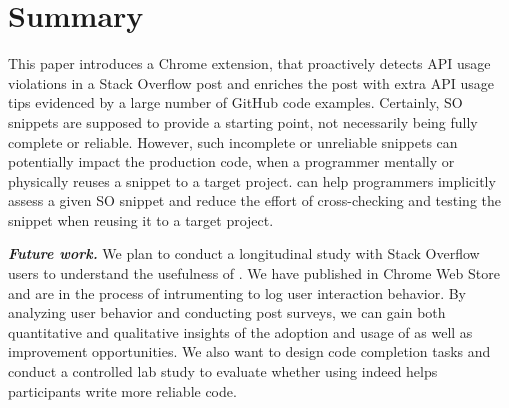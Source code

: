\section{Summary}
\label{sec:summary}
This paper introduces a Chrome extension, {\tool} that proactively detects API usage violations in a Stack Overflow post and enriches the post with extra API usage tips evidenced by a large number of GitHub code examples. Certainly, SO snippets are supposed to provide a starting point, not necessarily being fully complete or reliable. However, such incomplete or unreliable snippets can potentially impact the production code, when a programmer mentally or physically reuses a snippet to a target project. {\tool} can help programmers implicitly assess a given SO snippet and reduce the effort of cross-checking and testing the snippet when reusing it to a target project. 

{\bf\em Future work.} We plan to conduct a longitudinal study with Stack Overflow users to understand the usefulness of {\tool}. We have published {\tool} in Chrome Web Store and are in the process of intrumenting {\tool} to log user interaction behavior. By analyzing user behavior and conducting post surveys, we can gain both quantitative and qualitative insights of the adoption and usage of {\tool} as well as improvement opportunities. We also want to design code completion tasks and conduct a controlled lab study to evaluate whether using {\tool} indeed helps participants write more reliable code.